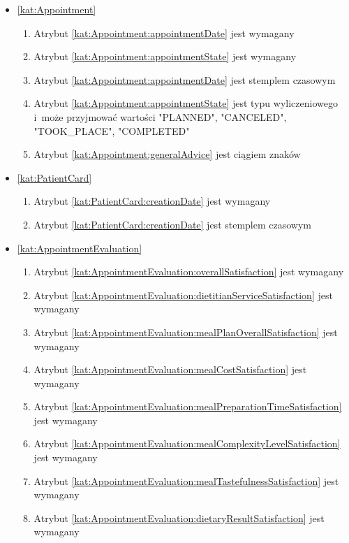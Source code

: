 \begin{itemize}[label={\textbf{Ograniczenia dla}}, wide, labelwidth=!, labelindent=0pt]
    \item\ref{kat:Appointment}
    \begin{enumerate}[label={\textbf{OGR/\protect\threedigits{\arabic{enumi}}}}, wide, labelwidth=!, align=left, leftmargin=3cm, resume]
        \item Atrybut \ref{kat:Appointment:appointmentDate} jest wymagany
        \item Atrybut \ref{kat:Appointment:appointmentState} jest wymagany

        \item Atrybut \ref{kat:Appointment:appointmentDate} jest stemplem czasowym
        \item Atrybut \ref{kat:Appointment:appointmentState} jest typu wyliczeniowego i~może przyjmować wartości "PLANNED", "CANCELED", "TOOK\_PLACE", "COMPLETED"
        \item Atrybut \ref{kat:Appointment:generalAdvice} jest ciągiem znaków
    \end{enumerate}

    \item\ref{kat:PatientCard}
    \begin{enumerate}[label={\textbf{OGR/\protect\threedigits{\arabic{enumi}}}}, wide, labelwidth=!, align=left, leftmargin=3cm, resume]
        \item Atrybut \ref{kat:PatientCard:creationDate} jest wymagany

        \item Atrybut \ref{kat:PatientCard:creationDate} jest stemplem czasowym
    \end{enumerate}

    \item\ref{kat:AppointmentEvaluation}
    \begin{enumerate}[label={\textbf{OGR/\protect\threedigits{\arabic{enumi}}}}, wide, labelwidth=!, align=left, leftmargin=3cm, resume]
        \item Atrybut \ref{kat:AppointmentEvaluation:overallSatisfaction} jest wymagany
        \item Atrybut \ref{kat:AppointmentEvaluation:dietitianServiceSatisfaction} jest wymagany
        \item Atrybut \ref{kat:AppointmentEvaluation:mealPlanOverallSatisfaction} jest wymagany
        \item Atrybut \ref{kat:AppointmentEvaluation:mealCostSatisfaction} jest wymagany
        \item Atrybut \ref{kat:AppointmentEvaluation:mealPreparationTimeSatisfaction} jest wymagany
        \item Atrybut \ref{kat:AppointmentEvaluation:mealComplexityLevelSatisfaction} jest wymagany
        \item Atrybut \ref{kat:AppointmentEvaluation:mealTastefulnessSatisfaction} jest wymagany
        \item Atrybut \ref{kat:AppointmentEvaluation:dietaryResultSatisfaction} jest wymagany


\end{enumerate}
\end{itemize}
